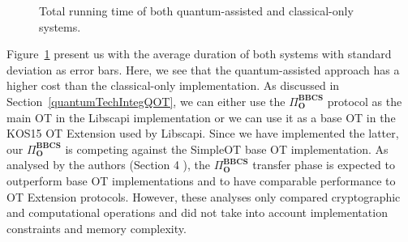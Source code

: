 
\begin{figure}
    \centering
{}
    \caption{Total running time of both quantum-assisted and classical-only systems.}
    \label{fig:total_running_time}
\end{figure}

Figure~\ref{fig:total_running_time} present us with the average duration of both systems with standard deviation as error bars. Here, we see that the quantum-assisted approach has a higher cost than the classical-only implementation. As discussed in Section~\ref{quantumTechIntegQOT}, we can either use the $\Pi^{\textbf{BBCS}}_{\textbf{O}}$ protocol as the main OT in the Libscapi implementation or we can use it as a base OT in the KOS15 OT Extension used by Libscapi. Since we have implemented the latter, our $\Pi^{\textbf{BBCS}}_{\textbf{O}}$ is competing against the SimpleOT \cite{C15} base OT implementation. As analysed by the authors (Section 4 \cite{SPM21}), the $\Pi^{\textbf{BBCS}}_{\textbf{O}}$ transfer phase is expected to outperform base OT implementations and to have comparable performance to OT Extension protocols. However, these analyses only compared cryptographic and computational operations and did not take into account implementation constraints and memory complexity.

